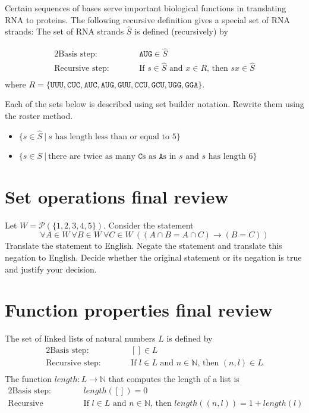 \documentclass[12pt, oneside]{article}
\newcommand{\A}[0]{\texttt{A}}
\newcommand{\C}[0]{\texttt{C}}
\newcommand{\G}[0]{\texttt{G}}
\newcommand{\U}[0]{\texttt{U}}
\begin{document}
Certain 
 sequences of bases serve important biological functions in translating RNA to proteins. The following
 recursive definition gives a special set of RNA strands: The set of RNA strands $\hat{S}$ is defined (recursively)
 by 
 
 \begin{alignat*}{2}
\text{Basis step:} & & \A\U\G \in \hat{S}\\
\text{Recursive step:} & \qquad& \text{If } s \in \hat{S} \text{ and } x \in R \text{, then } sx\in \hat{S}\\
 \end{alignat*}
 where $R = \{ \U\U\U, \C\U\C, \A\U\C, \A\U\G, \G\U\U, \C\C\U, \G\C\U, \U\G\G, \G\G\A \}$.

Each of the sets below is described using set builder notation. Rewrite them using the roster method. 
\begin{itemize}
\item $\{s \in \hat{S} ~|~ s \text{ has length less than or equal to $5$} \}$ 

\vspace{50pt}


\item $\{s \in S ~|~ \text{there are twice as many $\C$s as $\A$s in $s$ and $s$ has length $6$} \}$ 

\vspace{50pt}

\end{itemize} \vfill
\section*{Set operations final review}


Let $W = \mathcal{P}( \{ 1,2,3,4,5\})$. Consider the statement 
\[
\forall A \in W~ \forall B \in W ~ \forall C \in W~ ((A \cap B = A \cap C) \to (B=C) )
\]
Translate the statement to English.
Negate the statement 
and translate this negation to English.
Decide whether the original statement or its negation is true
and justify your decision.
 \vfill
\section*{Function properties final review}


The set of linked lists of natural numbers $L$ is defined by 
 \begin{alignat*}{2}
\text{Basis step:} & &[] \in L \\
\text{Recursive step:} & \qquad& \text{If } l \in L \text{ and } n \in \mathbb{N} \text{, then } (n,l) \in L\\
 \end{alignat*}
 The function $length: L \to \mathbb{N}$ that computes the length of a list is
  \begin{alignat*}{2}
\text{Basis step:} & &length([]) = 0\\
\text{Recursive step:} & \qquad& \text{If $l \in L$ and $n \in \mathbb{N}$, then } length( ( n,l) ) = 1 + length(l)\\
 \end{alignat*}
\end{document}
